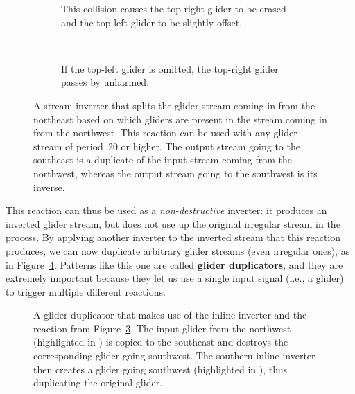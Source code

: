 \begin{figure}[!htb]
	\centering
	\begin{subfigure}{.48\textwidth}
		\centering
		\caption{This collision causes the top-right glider to be erased and the top-left glider to be slightly offset.}
		\label{fig:stream_inverter_yes}
	\end{subfigure} \ \ \ \ %
	\begin{subfigure}{.48\textwidth}
		\centering
		\caption{If the top-left glider is omitted, the top-right glider passes by unharmed.}
		\label{fig:stream_inverter_no}
	\end{subfigure}
	\caption{A stream inverter that splits the glider stream coming in from the northeast based on which gliders are present in the stream coming in from the northwest. This reaction can be used with any glider stream of period~$20$ or higher. The output stream going to the southeast is a duplicate of the input stream coming from the northwest, whereas the output stream going to the southwest is its inverse.}\label{fig:stream_inverter}
\end{figure}

This reaction can thus be used as a \emph{non-destructive} inverter: it produces an inverted glider stream, but does not use up the original irregular stream in the process. By applying another inverter to the inverted stream that this reaction produces, we can now duplicate arbitrary glider streams (even irregular ones), as in Figure~\ref{fig:periodic_glider_duplicator}. Patterns like this one are called \textbf{glider duplicators}, and they are extremely important because they let us use a single input signal (i.e., a glider) to trigger multiple different reactions.

\begin{figure}[!htb]
	\centering
	\caption{A glider duplicator that makes use of the inline inverter and the reaction from Figure~\ref{fig:stream_inverter}. The input glider from the northwest (highlighted in ) is copied to the southeast and destroys the corresponding glider going southwest. The southern inline inverter then creates a glider going southwest (highlighted in ), thus duplicating the original glider.}\label{fig:periodic_glider_duplicator}
\end{figure}


